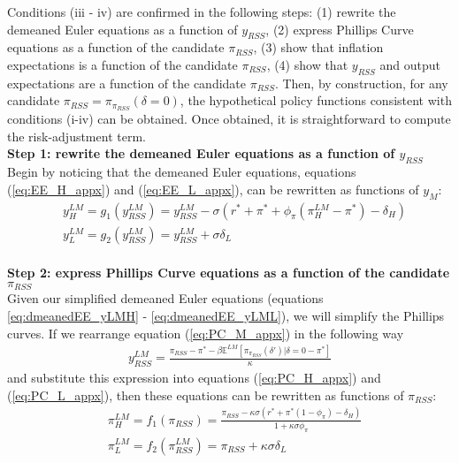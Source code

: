 \documentclass[11pt]{article}
\begin{document}
\begin{singlespace}
		Conditions (iii - iv) are confirmed in the following steps: (1) rewrite the demeaned Euler equations as a function of $y_{RSS}$, (2) express Phillips Curve equations as a function of the candidate $\pi_{RSS}$, (3) show that inflation expectations is a function of the candidate $\pi_{RSS}$, (4) show that  $y_{RSS}$ and output expectations are a function of the candidate $\pi_{RSS}$. Then, by construction, for any candidate $\pi_{RSS} = \pi_{\pi_{RSS}}(\delta=0)$, the hypothetical policy functions consistent with conditions (i-iv) can be obtained. Once obtained, it is straightforward to compute the risk-adjustment term. %
		\\
		\noindent \textbf{Step 1: rewrite the demeaned Euler equations as a function of $y_{RSS}$}\\
		Begin by noticing that the demeaned Euler equations, equations (\ref{eq:EE_H_appx}) and (\ref{eq:EE_L_appx}), can be rewritten as functions of $y_M$:
		\begin{align}
		& y^{LM}_{H} = g_1(y^{LM}_{RSS}) = y^{LM}_{RSS} - \sigma\left(r^* + \pi^* + \phi_{\pi}(\pi^{LM}_H - \pi^*) - \delta_{H}\right) \label{eq:dmeanedEE_yLMH} \\
		& y^{LM}_{L} = g_2(y^{LM}_{RSS})= y^{LM}_{RSS} + \sigma \delta_{L} \label{eq:dmeanedEE_yLML}
		\end{align}
		\\
		\noindent \textbf{Step 2: express Phillips Curve equations as a function of the candidate $\pi_{RSS}$}\\
		Given our simplified demeaned Euler equations (equations \ref{eq:dmeanedEE_yLMH} - \ref{eq:dmeanedEE_yLML}), we will simplify the Phillips curves. If we rearrange equation (\ref{eq:PC_M_appx}) in the following way
		\begin{align}
		y_{RSS}^{LM} = \frac{\pi_{RSS} - \pi^* - \beta\mathbb{E}^{LM}\left[\pi_{\pi_{RSS}}(\delta')|\delta=0 - \pi^*\right]}{\kappa} \label{eq:yLMRSS}
		\end{align}
		and substitute this expression into equations (\ref{eq:PC_H_appx}) and (\ref{eq:PC_L_appx}), then these equations can be rewritten as functions of $\pi_{RSS}$:
		\begin{align}
		& \pi^{LM}_{H} = f_1(\pi_{RSS}) =  \frac{\pi_{RSS} -\kappa\sigma(r^* + \pi^*(1-\phi_{\pi})- \delta_{H})}{1+\kappa\sigma\phi_{\pi}}\\
		& \pi^{LM}_{L} = f_2(\pi^{LM}_{RSS}) = \pi_{RSS} +\kappa\sigma \delta_{L}

\end{align}
\end{singlespace}
\end{document}
